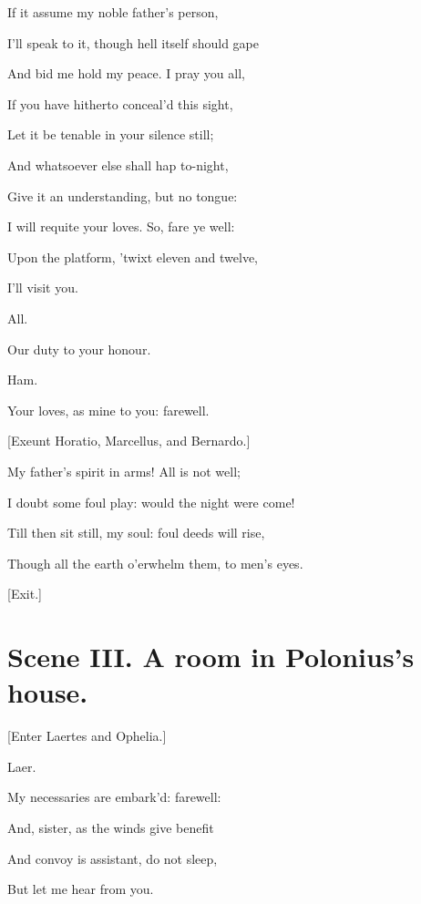 \documentclass[12pt]{book}
\begin{document}
If it assume my noble father's person,

I'll speak to it, though hell itself should gape

And bid me hold my peace. I pray you all,

If you have hitherto conceal'd this sight,

Let it be tenable in your silence still;

And whatsoever else shall hap to-night,

Give it an understanding, but no tongue:

I will requite your loves. So, fare ye well:

Upon the platform, 'twixt eleven and twelve,

I'll visit you.



All.

Our duty to your honour.



Ham.

Your loves, as mine to you: farewell.



[Exeunt Horatio, Marcellus, and Bernardo.]



My father's spirit in arms! All is not well;

I doubt some foul play: would the night were come!

Till then sit still, my soul: foul deeds will rise,

Though all the earth o'erwhelm them, to men's eyes.



[Exit.]







\section*{Scene III. A room in Polonius's house.}



[Enter Laertes and Ophelia.]



Laer.

My necessaries are embark'd: farewell:

And, sister, as the winds give benefit

And convoy is assistant, do not sleep,

But let me hear from you.
\end{document}
